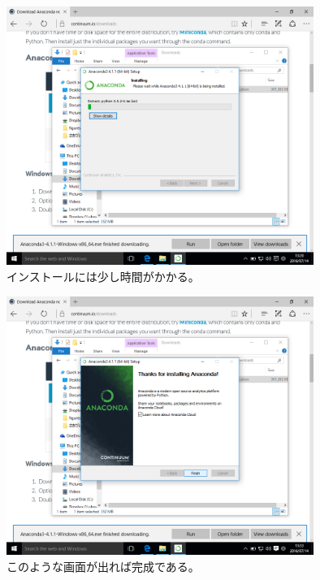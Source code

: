 \begin{figure}
	\centering
	\includegraphics[width=10cm]{TeX_files/fig_python_install/Anaconda_install3.png}
	\caption{
		\label{fig:Anaconda_install3}
		インストールには少し時間がかかる。
	}
\end{figure}

\begin{figure}
	\centering
	\includegraphics[width=10cm]{TeX_files/fig_python_install/Anaconda_install5.png}
	\caption{
		\label{fig:Anaconda_install5}
		このような画面が出れば完成である。
	}
\end{figure}
